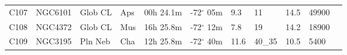 \documentclass[10pt,twoside,a4paper,english]{article}
\begin{document}
\begin{longtable}{@{}lllllllllll@{}}
C107       & NGC6101     & Glob CL    & Aps       & 00h 24.1m & -72$^{\circ}$ 05m  & 9.3       & 11                   & 14.5     & 49900               &                                 \\ 
C108       & NGC4372     & Glob CL    & Mus       & 16h 25.8m & -72$^{\circ}$ 12m  & 7.8       & 19                   & 14.2     & 18900               &                                 \\ 
C109       & NGC3195     & Pln Neb    & Cha       & 12h 25.8m & -72$^{\circ}$ 40m  & 11.6      & 40\_35               & 10.5     & 5400                &                                 \\ 
\hline 
\end{longtable} 
 
 
 
 
 
\end{document}
